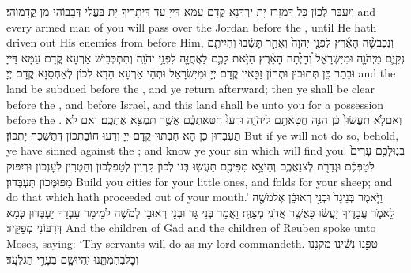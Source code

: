 {וְיִעְבַּר לְכוֹן כָּל דִּמְזָרַז יָת יַרְדְּנָא קֳדָם עַמָּא דַּייָ עַד דִּיתָרֵיךְ יָת בַּעֲלֵי דְּבָבוֹהִי מִן קֳדָמוֹהִי׃}
{and every armed man of you will pass over the Jordan before the \lord, until He hath driven out His enemies from before Him,}{}
{וְנִכְבְּשָׁ֨ה הָאָ֜רֶץ לִפְנֵ֤י יְהֹוָה֙ וְאַחַ֣ר תָּשֻׁ֔בוּ וִהְיִיתֶ֧ם נְקִיִּ֛ם מֵיְהֹוָ֖ה וּמִיִּשְׂרָאֵ֑ל וְ֠הָיְתָ֠ה הָאָ֨רֶץ הַזֹּ֥את לָכֶ֛ם לַאֲחֻזָּ֖ה לִפְנֵ֥י יְהֹוָֽה׃}
{וְתִתְכְּבֵישׁ אַרְעָא קֳדָם עַמָּא דַּייָ וּבָתַר כֵּן תְּתוּבוּן וּתְהוֹן זַכָּאִין קֳדָם יְיָ וּמִיִּשְׂרָאֵל וּתְהֵי אַרְעָא הָדָא לְכוֹן לְאַחְסָנָא קֳדָם יְיָ׃}
{and the land be subdued before the \lord, and ye return afterward; then ye shall be clear before the \lord, and before Israel, and this land shall be unto you for a possession before the \lord.}{}
{וְאִם\maqqaf לֹ֤א תַעֲשׂוּן֙ כֵּ֔ן הִנֵּ֥ה חֲטָאתֶ֖ם לַיהֹוָ֑ה וּדְעוּ֙ חַטַּאתְכֶ֔ם אֲשֶׁ֥ר תִּמְצָ֖א אֶתְכֶֽם׃}
{וְאִם לָא תַעְבְּדוּן כֵּן הָא חַבְתּוּן קֳדָם יְיָ וְדַעוּ חוֹבַתְכוֹן דְּתַשְׁכַּח יָתְכוֹן׃}
{But if ye will not do so, behold, ye have sinned against the \lord; and know ye your sin which will find you.}{}
{בְּנֽוּ\maqqaf לָכֶ֤ם עָרִים֙ לְטַפְּכֶ֔ם וּגְדֵרֹ֖ת לְצֹנַאֲכֶ֑ם וְהַיֹּצֵ֥א מִפִּיכֶ֖ם תַּעֲשֽׂוּ׃}
{בְּנוֹ לְכוֹן קִרְוִין לְטַפְלְכוֹן וְחַטְרִין לְעָנְכוֹן וּדְיִפּוֹק מִפּוּמְּכוֹן תַּעְבְּדוּן׃}
{Build you cities for your little ones, and folds for your sheep; and do that which hath proceeded out of your mouth.’}{}
{וַיֹּ֤אמֶר בְּנֵי\maqqaf גָד֙ וּבְנֵ֣י רְאוּבֵ֔ן אֶל\maqqaf מֹשֶׁ֖ה לֵאמֹ֑ר עֲבָדֶ֣יךָ יַעֲשׂ֔וּ כַּאֲשֶׁ֥ר אֲדֹנִ֖י מְצַוֶּֽה׃}
{וַאֲמַר בְּנֵי גָּד וּבְנֵי רְאוּבֵן לְמֹשֶׁה לְמֵימַר עַבְדָךְ יַעְבְּדוּן כְּמָא דְּרִבּוֹנִי מְפַקֵּיד׃}
{And the children of Gad and the children of Reuben spoke unto Moses, saying: ‘Thy servants will do as my lord commandeth.}{}
{טַפֵּ֣נוּ נָשֵׁ֔ינוּ מִקְנֵ֖נוּ וְכׇל\maqqaf בְּהֶמְתֵּ֑נוּ יִֽהְיוּ\maqqaf שָׁ֖ם בְּעָרֵ֥י הַגִּלְעָֽד׃}
